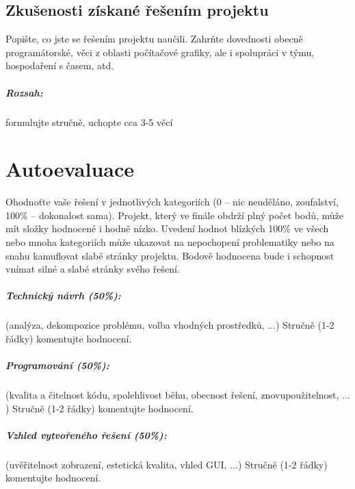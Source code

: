 \documentclass[12pt,a4paper,titlepage,final]{report}
\begin{document}
\section{Zkušenosti získané řešením projektu}

Popište, co jste se řešením projektu naučili. Zahrňte dovednosti obecně
programátorské, věci z oblasti počítačové grafiky, ale i spolupráci v týmu,
hospodaření s časem, atd.

\paragraph{Rozsah:} formulujte stručně, uchopte cca 3-5 věcí

\chapter{Autoevaluace}

Ohodnoťte vaše řešení v jednotlivých kategoriích (0 – nic neuděláno,
zoufalství, 100\% – dokonalost sama). Projekt, který ve finále obdrží plný
počet bodů, může mít složky hodnocené i hodně nízko. Uvedení hodnot blízkých
100\% ve všech nebo mnoha kategoriích může ukazovat na nepochopení problematiky nebo na snahu kamuflovat slabé stránky projektu. Bodově hodnocena bude i
schopnost vnímat silné a slabé stránky svého řešení.

\paragraph{Technický návrh (50\%):} (analýza, dekompozice problému, volba
vhodných prostředků, $\ldots$)
Stručně (1-2 řádky) komentujte hodnocení.

\paragraph{Programování (50\%):} (kvalita a čitelnost kódu, spolehlivost běhu,
obecnost řešení, znovupoužitelnost, $\ldots$)
Stručně (1-2 řádky) komentujte hodnocení.

\paragraph{Vzhled vytvořeného řešení (50\%):} (uvěřitelnost zobrazení,
estetická kvalita, vhled GUI, $\ldots$)
Stručně (1-2 řádky) komentujte hodnocení.
\end{document}
